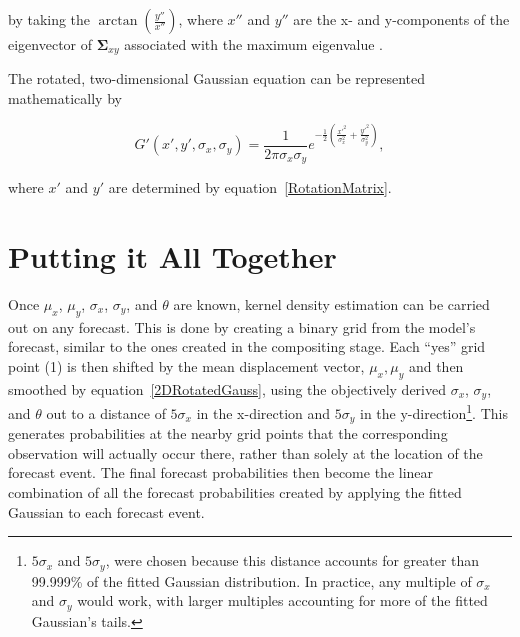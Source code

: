 \noindent by taking the $\arctan{\left(\frac{y''}{x''}\right)}$, where $x''$ and $y''$ are the x- and y-components of the eigenvector of $\boldsymbol{\Sigma}_{xy}$ associated with the maximum eigenvalue \citep{Lak2010}.

The rotated, two-dimensional Gaussian equation can be represented mathematically by

    \begin{equation}
        \label{2DRotatedGauss}
        G'(x', y', \sigma_x, \sigma_y) = \frac{1}{2 \pi \sigma_x \sigma_y} e^{- \frac{1}{2} \left( \frac{x'^2}{\sigma_x^2} + \frac{y'^2}{\sigma_y^2} \right)},
    \end{equation}

\noindent where $x'$ and $y'$ are determined by \mbox{equation \ref{RotationMatrix}}.




\section{Putting it All Together}
\label{kde}

Once $\mu_x$, $\mu_y$, $\sigma_x$, $\sigma_y$, and $\theta$ are known, kernel density estimation can be carried out on any forecast.
This is done by creating a binary grid from the model's forecast, similar to the ones created in the compositing stage.
Each ``yes'' grid point (1) is then shifted by the mean displacement vector, ${\mu_x, \mu_y}$ and then smoothed by \mbox{equation \ref{2DRotatedGauss}}, using the objectively derived $\sigma_x$, $\sigma_y$, and $\theta$ out to a distance of $5\sigma_x$ in the x-direction and $5\sigma_y$ in the y-direction\footnote{$5\sigma_x$ and $5\sigma_y$, were chosen because this distance accounts for greater than 99.999\% of the fitted Gaussian distribution.
In practice, any multiple of $\sigma_x$ and $\sigma_y$ would work, with larger multiples accounting for more of the fitted Gaussian's tails.}.
This generates probabilities at the nearby grid points that the corresponding observation will actually occur there, rather than solely at the location of the forecast event.
The final forecast probabilities then become the linear combination of all the forecast probabilities created by applying the fitted Gaussian to each forecast event.
